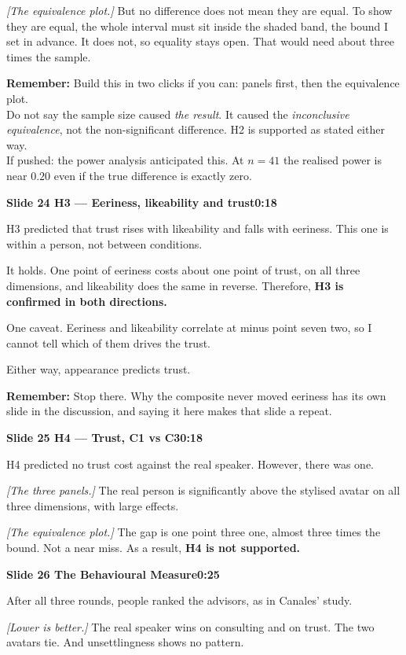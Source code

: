 \documentclass[11pt,a4paper]{article}
\newcommand{\slidehead}[3]{%
  \needspace{5\baselineskip}
  \vspace{0.9em}
  \noindent\colorbox{knblue}{\parbox{0.978\textwidth}{\vspace{1pt}\color{white}\textbf{Slide #1 \quad #2}\hfill\textbf{#3}\vspace{1pt}}}
  \vspace{0.35em}\par}
\newcommand{\remind}[1]{%
  \vspace{0.15em}
  \noindent\colorbox{knlight}{\parbox{0.972\textwidth}{\small\color{knblue}\textbf{Remember:} #1}}
  \vspace{0.2em}\par}
\newcommand{\pointto}[1]{{\color{knaccent}\textit{[#1]}}}
\begin{document}
\pointto{The equivalence plot.} But no difference does not mean they are equal. To show they are equal, the whole interval must sit inside the shaded band, the bound I set in advance. It does not, so equality stays open. That would need about three times the sample.

\remind{Build this in two clicks if you can: panels first, then the equivalence plot.\\[0.4em] Do not say the sample size caused \emph{the result}. It caused the \emph{inconclusive equivalence}, not the non-significant difference. H2 is supported as stated either way.\\[0.4em] If pushed: the power analysis anticipated this. At $n=41$ the realised power is near $0.20$ even if the true difference is exactly zero.}

\slidehead{24}{H3 — Eeriness, likeability and trust}{0:18}

H3 predicted that trust rises with likeability and falls with eeriness. This one is within a person, not between conditions.

It holds. One point of eeriness costs about one point of trust, on all three dimensions, and likeability does the same in reverse. Therefore, \textbf{H3 is confirmed in both directions.}

One caveat. Eeriness and likeability correlate at minus point seven two, so I cannot tell which of them drives the trust.

Either way, appearance predicts trust.

\remind{Stop there. Why the composite never moved eeriness has its own slide in the discussion, and saying it here makes that slide a repeat.}

\slidehead{25}{H4 — Trust, C1 vs C3}{0:18}

H4 predicted no trust cost against the real speaker. However, there was one.

\pointto{The three panels.} The real person is significantly above the stylised avatar on all three dimensions, with large effects.

\pointto{The equivalence plot.} The gap is one point three one, almost three times the bound. Not a near miss. As a result, \textbf{H4 is not supported.}

\slidehead{26}{The Behavioural Measure}{0:25}

After all three rounds, people ranked the advisors, as in Canales' study.

\pointto{Lower is better.} The real speaker wins on consulting and on trust. The two avatars tie. And unsettlingness shows no pattern.
\end{document}
